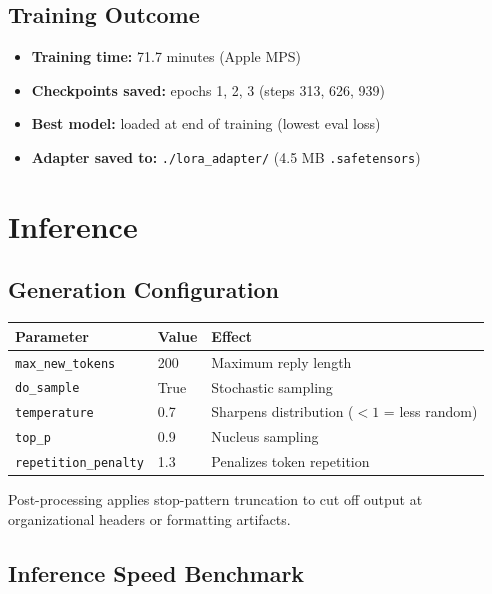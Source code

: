 \documentclass[12pt,a4paper]{article}
\begin{document}
\subsection{Training Outcome}

\begin{itemize}
  \item \textbf{Training time:} 71.7 minutes (Apple MPS)
  \item \textbf{Checkpoints saved:} epochs 1, 2, 3 (steps 313, 626, 939)
  \item \textbf{Best model:} loaded at end of training (lowest eval loss)
  \item \textbf{Adapter saved to:} \texttt{./lora\_adapter/} (4.5 MB \texttt{.safetensors})
\end{itemize}

\section{Inference}

\subsection{Generation Configuration}

\begin{center}
\begin{tabular}{lll}
\toprule
Parameter & Value & Effect \\
\midrule
\texttt{max\_new\_tokens} & 200 & Maximum reply length \\
\texttt{do\_sample} & True & Stochastic sampling \\
\texttt{temperature} & 0.7 & Sharpens distribution ($<1$ = less random) \\
\texttt{top\_p} & 0.9 & Nucleus sampling \\
\texttt{repetition\_penalty} & 1.3 & Penalizes token repetition \\
\bottomrule
\end{tabular}
\end{center}

Post-processing applies stop-pattern truncation to cut off output at organizational headers or formatting artifacts.

\subsection{Inference Speed Benchmark}
\end{document}
